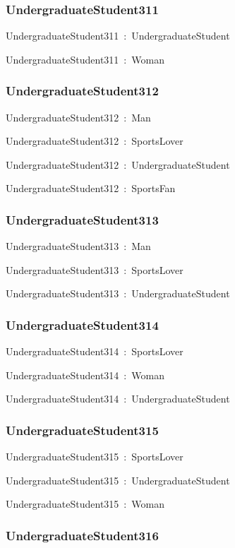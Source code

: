 \documentclass{article}
\begin{document}
\subsubsection*{UndergraduateStudent311}

UndergraduateStudent311~:~UndergraduateStudent

UndergraduateStudent311~:~Woman

\subsubsection*{UndergraduateStudent312}

UndergraduateStudent312~:~Man

UndergraduateStudent312~:~SportsLover

UndergraduateStudent312~:~UndergraduateStudent

UndergraduateStudent312~:~SportsFan

\subsubsection*{UndergraduateStudent313}

UndergraduateStudent313~:~Man

UndergraduateStudent313~:~SportsLover

UndergraduateStudent313~:~UndergraduateStudent

\subsubsection*{UndergraduateStudent314}

UndergraduateStudent314~:~SportsLover

UndergraduateStudent314~:~Woman

UndergraduateStudent314~:~UndergraduateStudent

\subsubsection*{UndergraduateStudent315}

UndergraduateStudent315~:~SportsLover

UndergraduateStudent315~:~UndergraduateStudent

UndergraduateStudent315~:~Woman

\subsubsection*{UndergraduateStudent316}
\end{document}
